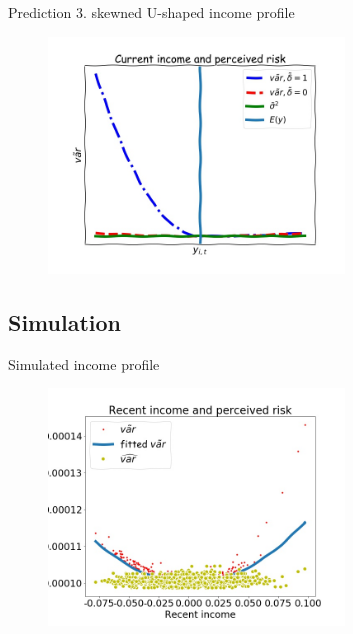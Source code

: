 \documentclass{beamer}
\begin{document}
\begin{frame}{Prediction 3. skewned U-shaped income profile}
		\begin{figure}
		\centering 
		\label{var_experience_var}
		\includegraphics[width=0.7\textwidth]{figures/var_recent.jpg}
	\end{figure}
\end{frame}



\subsection{Simulation}	


\begin{frame}{Simulated income profile}
	\begin{figure}
		\centering 
		\label{var_experience_var}
		\includegraphics[width=0.7\textwidth]{figures/var_recent_sim.jpg}
	\end{figure}
\end{frame}
\end{document}
